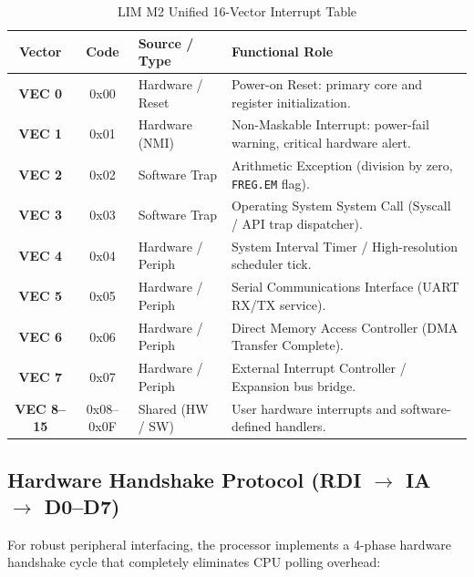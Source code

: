 \documentclass[11pt,a4paper]{article}
\newcommand{\reg}[1]{\texttt{#1}}
\begin{document}
\begin{table}[h]
\centering
\caption{LIM M2 Unified 16-Vector Interrupt Table}
\label{tab:vectors}
\begin{tabularx}{\textwidth}{>{\bfseries}c >{\ttfamily}c p{32mm}X}
\toprule
Vector & Code & Source / Type & Functional Role \\
\midrule
VEC 0  & 0x00 & Hardware / Reset   & Power-on Reset: primary core and register initialization. \\
VEC 1  & 0x01 & Hardware (NMI)     & Non-Maskable Interrupt: power-fail warning, critical hardware alert. \\
VEC 2  & 0x02 & Software Trap      & Arithmetic Exception (division by zero, \reg{FREG.EM} flag). \\
VEC 3  & 0x03 & Software Trap      & Operating System System Call (Syscall / API trap dispatcher). \\
VEC 4  & 0x04 & Hardware / Periph  & System Interval Timer / High-resolution scheduler tick. \\
VEC 5  & 0x05 & Hardware / Periph  & Serial Communications Interface (UART RX/TX service). \\
VEC 6  & 0x06 & Hardware / Periph  & Direct Memory Access Controller (DMA Transfer Complete). \\
VEC 7  & 0x07 & Hardware / Periph  & External Interrupt Controller / Expansion bus bridge. \\
VEC 8--15 & 0x08--0x0F & Shared (HW / SW) & User hardware interrupts and software-defined handlers. \\
\bottomrule
\end{tabularx}
\end{table}

\subsection{Hardware Handshake Protocol (RDI $\to$ IA $\to$ D0--D7)}
For robust peripheral interfacing, the processor implements a 4-phase hardware handshake cycle that completely eliminates CPU polling overhead:
\end{document}
